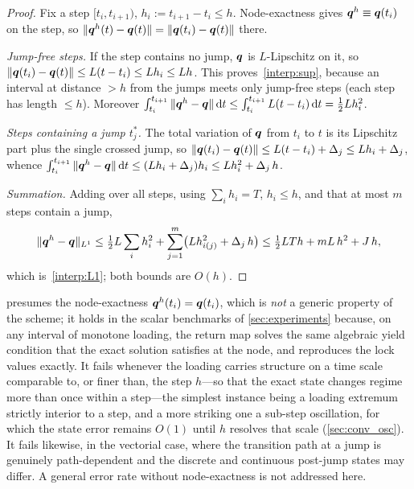 \begin{proof}
Fix a step $[t_i,t_{i+1})$, $h_i:=t_{i+1}-t_i\le h$. Node-exactness gives
$\bm{q}^h\equiv\bm{q}(t_i)$ on the step, so
$\|\bm{q}^h(t)-\bm{q}(t)\|=\|\bm{q}(t_i)-\bm{q}(t)\|$ there.

\emph{Jump-free steps.} If the step contains no jump, $\bm{q}$ is
$L$-Lipschitz on it, so $\|\bm{q}(t_i)-\bm{q}(t)\|\le L(t-t_i)\le L h_i\le Lh$.
This proves~\ref{interp:sup}, because an interval at distance $>h$ from
the jumps meets only jump-free steps (each step has length $\le h$).
Moreover $\int_{t_i}^{t_{i+1}}\|\bm{q}^h-\bm{q}\|\mathop{}\!\mathrm{d} t\le\int_{t_i}^{t_{i+1}}L(t-t_i)\mathop{}\!\mathrm{d} t=\tfrac12 L h_i^2$.

\emph{Steps containing a jump $t^\ast_j$.} The total variation of
$\bm{q}$ from $t_i$ to $t$ is its Lipschitz part plus the single crossed
jump, so $\|\bm{q}(t_i)-\bm{q}(t)\|\le L(t-t_i)+\Delta_j\le L h_i+\Delta_j$,
whence $\int_{t_i}^{t_{i+1}}\|\bm{q}^h-\bm{q}\|\mathop{}\!\mathrm{d} t\le(L h_i+\Delta_j)h_i\le L h_i^2+\Delta_j\,h$.

\emph{Summation.} Adding over all steps, using $\sum_i h_i=T$,
$h_i\le h$, and that at most $m$ steps contain a jump,
\[
  \|\bm{q}^h-\bm{q}\|_{L^1}
  \le\tfrac12 L\sum_i h_i^2+\sum_{j=1}^m\bigl(L h_{i(j)}^2+\Delta_j\,h\bigr)
  \le\tfrac12 L T h+mL\,h^2+J\,h,
\]
which is~\ref{interp:L1}; both bounds are $O(h)$.
\end{proof}

\begin{remark}\label{rem:interp_scope}
 presumes the node-exactness $\bm{q}^h(t_i)=\bm{q}(t_i)$,
which is \emph{not} a generic property of the scheme; it holds in the
scalar benchmarks of \cref{sec:experiments} because, on any interval of
monotone loading, the return map solves the same algebraic yield
condition that the exact solution satisfies at the node, and reproduces
the lock values exactly. It fails whenever the loading carries structure
on a time scale comparable to, or finer than, the step $h$---so that the
exact state changes regime more than once within a step---the simplest
instance being a loading extremum strictly interior to a step, and a more
striking one a sub-step oscillation, for which the state error remains
$O(1)$ until $h$ resolves that scale (\cref{sec:conv_osc}). It fails
likewise, in the vectorial case, where the transition path at a jump is
genuinely path-dependent and the discrete and continuous post-jump states
may differ. A general error rate without node-exactness is not addressed
here.
\end{remark}

